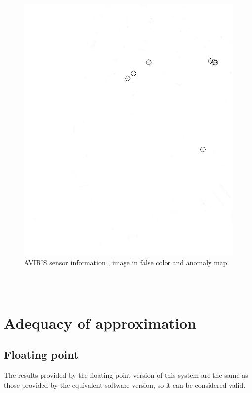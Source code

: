 \begin{figure}[!ht]
\begin{minipage}[t]{0.28\linewidth}
\includegraphics[width=\linewidth, frame]{figures/wtc_rx.png}
\end{minipage}
    \caption[AVIRIS sensor information and used dataset]{AVIRIS sensor information \cite{aviris_sensor}, image in false color and anomaly map}
  \end{figure}
\\
\\
\section{Adequacy of approximation}
\subsection{Floating point}
The results provided by the floating point version of this system are the same as those provided by the equivalent software version, so it can be considered valid.

